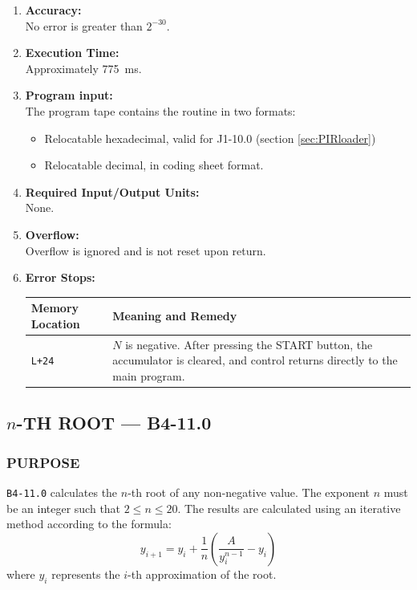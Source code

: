 \begin{enumerate}[leftmargin=1.5em, itemsep=6pt]
    \item \textbf{Accuracy:} \\
    No error is greater than $2^{-30}$.

    \item \textbf{Execution Time:} \\
    Approximately 775~ms.

    \item \textbf{Program input:} \\
    The program tape contains the routine in two formats:
    \begin{itemize}
      \item Relocatable hexadecimal, valid for J1-10.0 (section \ref{sec:PIRloader})
        \item Relocatable decimal, in coding sheet format.
    \end{itemize}

    \item \textbf{Required Input/Output Units:} \\
    None.

    \item \textbf{Overflow:} \\
    Overflow is ignored and is not reset upon return.

    \item \textbf{Error Stops:} \\
    \begin{tabularx}{\textwidth}{lX}
        \toprule
        \textbf{Memory Location} & \textbf{Meaning and Remedy} \\
        \midrule
        \texttt{L+24}            & $N$ is negative. After pressing the \textsf{START} button, the accumulator is cleared, and control returns directly to the main program. \\
        \bottomrule
    \end{tabularx}
\end{enumerate}
\newpage
\subsection*{$n$-TH ROOT --- B4-11.0}
\label{sec:nth_root}

\subsubsection*{PURPOSE}
\texttt{B4-11.0} calculates the $n$-th root of any non-negative value. The exponent $n$ must be an integer such that $2 \le n \le 20$. The results are calculated using an iterative method according to the formula:
\begin{equation}
    y_{i+1} = y_i + \frac{1}{n} \left( \frac{A}{y_i^{n-1}} - y_i \right)
\end{equation}
where $y_i$ represents the $i$-th approximation of the root.

